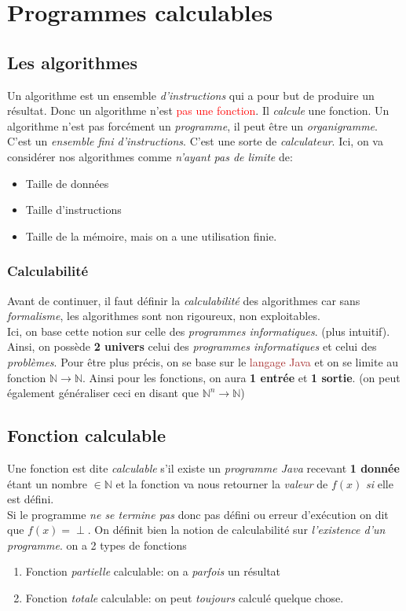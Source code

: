 \documentclass{report}
\begin{document}
\chapter{Programmes calculables}
\section{Les algorithmes}
Un algorithme est un ensemble \textit{d'instructions} qui a pour but de produire un résultat. Donc un algorithme n'est \textcolor{red}{pas une fonction}. Il \textit{calcule} une fonction. Un algorithme n'est pas forcément un \textit{programme}, il peut être un \textit{organigramme}. C'est un \textit{ensemble fini d'instructions}. C'est une sorte de \textit{calculateur}. Ici, on va considérer nos algorithmes comme \textit{n'ayant pas de limite} de:
\begin{itemize}
\item Taille de données
\item Taille d'instructions
\item Taille de la mémoire, mais on a une utilisation finie.
\end{itemize}

\subsection{Calculabilité}
Avant de continuer, il faut définir la \textit{calculabilité} des algorithmes car sans \textit{formalisme}, les algorithmes sont non rigoureux, non exploitables.\\

Ici, on base cette notion sur celle des \textit{programmes informatiques}. (plus intuitif).
Ainsi, on possède \textbf{2 univers} celui des \textit{programmes informatiques} et celui des \textit{problèmes}. Pour être plus précis, on se base sur le \textcolor{brown}{langage Java} et on se limite au fonction $\mathbb{N} \rightarrow \mathbb{N}$. Ainsi pour les fonctions, on aura \textbf{1 entrée} et \textbf{1 sortie}. (on peut également généraliser ceci en disant que $\mathbb{N}^n \rightarrow \mathbb{N}$)

\section{Fonction calculable}
Une fonction est dite \textit{calculable} s'il existe un \textit{programme Java} recevant \textbf{1 donnée} étant un nombre $\in \mathbb{N}$ et la fonction va nous retourner la \textit{valeur} de $f(x)$ \textit{si} elle est défini.\\
Si le programme \textit{ne se termine pas} donc pas défini ou erreur d'exécution on dit que $f(x) = \perp$. On définit bien la notion de calculabilité sur \textit{l'existence d'un programme}. on a 2 types de fonctions
\begin{enumerate}
\item Fonction \textit{partielle} calculable: on a \textit{parfois} un résultat
\item Fonction \textit{totale} calculable: on peut \textit{toujours} calculé quelque chose.
\end{enumerate}
\end{document}
